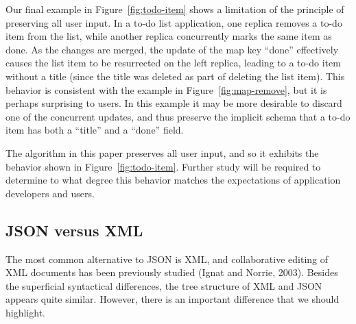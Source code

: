 \documentclass[a4paper,twocolumn,10pt]{article}
\begin{document}
\begin{figure*}
\centering
{}
\caption{One replica removes a list element, while another concurrently updates its contents}\label{fig:todo-item}
\end{figure*}

Our final example in Figure~\ref{fig:todo-item} shows a limitation of the principle of preserving all user input. In a to-do list application, one replica removes a to-do item from the list, while another replica concurrently marks the same item as done. As the changes are merged, the update of the map key ``done'' effectively causes the list item to be resurrected on the left replica, leading to a to-do item without a title (since the title was deleted as part of deleting the list item). This behavior is consistent with the example in Figure~\ref{fig:map-remove}, but it is perhaps surprising to users. In this example it may be more desirable to discard one of the concurrent updates, and thus preserve the implicit schema that a to-do item has both a ``title'' and a ``done'' field.

The algorithm in this paper preserves all user input, and so it exhibits the behavior shown in Figure~\ref{fig:todo-item}. Further study will be required to determine to what degree this behavior matches the expectations of application developers and users.

\subsection{JSON versus XML}

The most common alternative to JSON is XML, and collaborative editing of XML documents has been previously studied (Ignat and Norrie, 2003). Besides the superficial syntactical differences, the tree structure of XML and JSON appears quite similar. However, there is an important difference that we should highlight.
\end{document}

